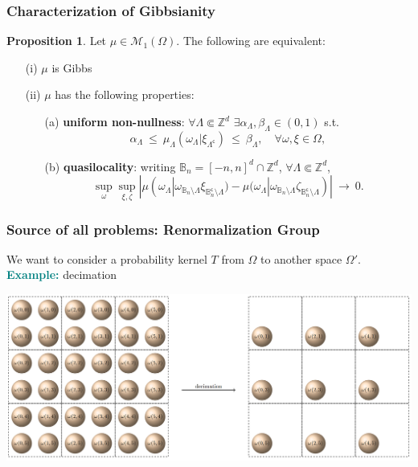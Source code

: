 \documentclass{beamer}
\newcommand{\BBB}{\mathbb{B}}
\renewcommand{\c}{\mathsf{c}}
\newcommand{\M}{\mathcal{M}}
\newcommand{\Z}{\mathbb{Z}}
\newcommand{\ra}{\rightarrow}
\newcommand{\1}{\mathbbm{1}}
\renewcommand{\c}{\mathsf{c}}
\newcommand{\5}{\vspace{0.5cm}}
\newcommand{\3}{\vspace{0.3cm}}
\theoremstyle{definition}
\newtheorem{prop}[thm]{Proposition}
\begin{document}
\begin{frame}
\frametitle{Characterization of Gibbsianity}
\begin{prop}
Let $\mu\in\M_1(\Omega)$. The following are equivalent:\pause
	\begin{itemize}
		\item[(i)] $\mu$ is Gibbs\pause
		\item[(ii)] $\mu$ has the following properties:\pause
		\begin{itemize}
			\item[(a)] \textbf{uniform non-nullness}: $\forall\Lambda\Subset\Z^d$ $\exists \alpha_\Lambda,\beta_\Lambda\in(0,1)$ s.t.
			$$\alpha_\Lambda ~\leq~ \mu_\Lambda(\omega_\Lambda|\xi_{\Lambda^\c}) ~\leq~ \beta_\Lambda, \quad \forall \omega,\xi\in\Omega,$$\pause
			\item[(b)] \textbf{quasilocality}: writing $\BBB_n=[-n,n]^d\cap\Z^d$, $\forall \Lambda\Subset\Z^d$,
			$$\sup_{\omega}\sup_{\xi,\zeta}|\mu(\omega_\Lambda|\omega_{\BBB_n\setminus\Lambda}\xi_{\BBB_n^\c\setminus\Lambda})-\mu(\omega_\Lambda|\omega_{\BBB_n\setminus\Lambda}\zeta_{\BBB_n^\c\setminus\Lambda})| ~\ra~ 0.$$ 
		\end{itemize}
	\end{itemize}
\end{prop}
\end{frame}


\begin{frame}
\frametitle{Source of all problems: Renormalization Group}
We want to consider a probability kernel $T$ from $\Omega$ to another space $\Omega'$. \\\vspace{0.5cm}\pause
\textcolor{teal}{\textbf{Example:}} decimation 
\begin{center}
\includegraphics[scale=0.4]{decimation}
\end{center}
\end{frame}
\end{document}
